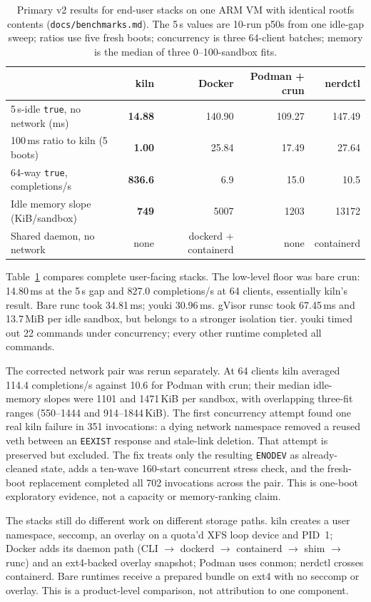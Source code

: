 \documentclass[10pt,letterpaper]{article}
\newcommand{\code}[1]{\texttt{#1}}
\begin{document}
\begin{table}[t]
\centering\small
\caption{Primary v2 results for end-user stacks on one ARM VM with identical
rootfs contents (\code{docs/benchmarks.md}). The 5\,s values are 10-run p50s
from one idle-gap sweep; ratios use five fresh boots; concurrency is three
64-client batches; memory is the median of three 0--100-sandbox fits.}
\label{tab:perf}
\begin{tabular}{@{}lrrrr@{}}
\toprule
 & kiln & Docker & Podman + crun & nerdctl \\
\midrule
5\,s-idle \code{true}, no network (ms) & \textbf{14.88} & 140.90 & 109.27 & 147.49 \\
100\,ms ratio to kiln (5 boots) & \textbf{1.00} & 25.84 & 17.49 & 27.64 \\
64-way \code{true}, completions/s & \textbf{836.6} & 6.9 & 15.0 & 10.5 \\
Idle memory slope (KiB/sandbox) & \textbf{749} & 5007 & 1203 & 13172 \\
Shared daemon, no network & none & dockerd + containerd & none & containerd \\
\bottomrule
\end{tabular}
\end{table}

Table~\ref{tab:perf} compares complete user-facing stacks. The low-level floor
was bare crun: 14.80\,ms at the 5\,s gap and 827.0 completions/s at 64 clients,
essentially kiln's result. Bare runc took 34.81\,ms; youki 30.96\,ms. gVisor
runsc took 67.45\,ms and 13.7\,MiB per idle sandbox, but belongs to a stronger
isolation tier. youki timed out 22 commands under concurrency; every other
runtime completed all commands.

The corrected network pair was rerun separately. At 64 clients kiln averaged
114.4 completions/s against 10.6 for Podman with crun; their median idle-memory
slopes were 1101 and 1471\,KiB per sandbox, with overlapping three-fit ranges
(550--1444 and 914--1844\,KiB). The first concurrency attempt found one real
kiln failure in 351 invocations: a dying network namespace removed a reused
veth between an \code{EEXIST} response and stale-link deletion. That attempt is
preserved but excluded. The fix treats only the resulting \code{ENODEV} as
already-cleaned state, adds a ten-wave 160-start concurrent stress check, and the fresh-boot
replacement completed all 702 invocations across the pair. This is one-boot exploratory
evidence, not a capacity or memory-ranking claim.

The stacks still do different work on different storage paths. kiln creates a
user namespace, seccomp, an overlay on a quota'd XFS loop device and PID~1;
Docker adds its daemon path (CLI $\rightarrow$ dockerd $\rightarrow$ containerd
$\rightarrow$ shim $\rightarrow$ runc) and an ext4-backed overlay snapshot;
Podman uses conmon; nerdctl crosses containerd. Bare runtimes receive a prepared
bundle on ext4 with no seccomp or overlay. This is a product-level comparison,
not attribution to one component.
\end{document}
